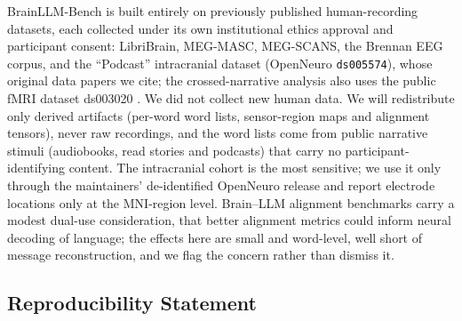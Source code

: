 \documentclass{article}
\begin{document}
BrainLLM-Bench is built entirely on previously published human-recording datasets,
each collected under its own institutional ethics approval and participant consent:
LibriBrain, MEG-MASC, MEG-SCANS, the Brennan EEG corpus, and the ``Podcast''
intracranial dataset (OpenNeuro \texttt{ds005574}), whose original data papers we
cite; the crossed-narrative analysis also uses the public fMRI dataset ds003020
\citep{lebel2023natural}. We did not collect new human data. We will redistribute only
derived artifacts (per-word word lists, sensor-region maps and alignment tensors), never raw
recordings, and the word lists come from public narrative stimuli (audiobooks,
read stories and podcasts) that carry no participant-identifying content. The intracranial
cohort is the most sensitive; we use it only through the maintainers' de-identified
OpenNeuro release and report electrode locations only at the MNI-region level.
Brain--LLM alignment benchmarks carry a modest dual-use consideration, that better
alignment metrics could inform neural decoding of language; the effects here are
small and word-level, well short of message reconstruction, and we flag the concern
rather than dismiss it.

\subsection*{Reproducibility Statement}\label{reproducibility}
\end{document}
